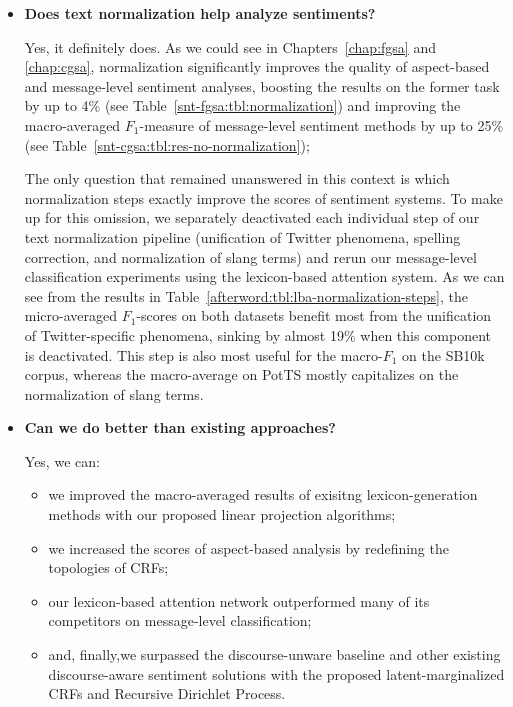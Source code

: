 \documentclass[11pt]{article}
\newcommand{\F}[0]{$F_1$}
\begin{document}
\begin{itemize}
  \item\textbf{Does text normalization help analyze sentiments?}

    Yes, it definitely does.  As we could see in
    Chapters~\ref{chap:fgsa} and \ref{chap:cgsa}, normalization
    significantly improves the quality of aspect-based and
    message-level sentiment analyses, boosting the results on the
    former task by up to 4\% (see
    Table~\ref{snt-fgsa:tbl:normalization}) and improving the
    macro-averaged \F{}-measure of message-level sentiment methods by
    up to 25\% (see Table~\ref{snt-cgsa:tbl:res-no-normalization});

    The only question that remained unanswered in this context is
    which normalization steps exactly improve the scores of sentiment
    systems.  To make up for this omission, we separately deactivated
    each individual step of our text normalization pipeline
    (unification of Twitter phenomena, spelling correction, and
    normalization of slang terms) and rerun our message-level
    classification experiments using the lexicon-based attention
    system.  As we can see from the results in
    Table~\ref{afterword:tbl:lba-normalization-steps}, the
    micro-averaged \F{}-scores on both datasets benefit most from the
    unification of Twitter-specific phenomena, sinking by almost 19\%
    when this component is deactivated.  This step is also most useful
    for the macro-\F{} on the SB10k corpus, whereas the macro-average
    on PotTS mostly capitalizes on the normalization of slang terms.

  \item\textbf{Can we do better than existing approaches?}

    Yes, we can:
    \begin{itemize}
    \item we improved the macro-averaged results of exisitng
      lexicon-generation methods with our proposed linear projection
      algorithms;
    \item we increased the scores of aspect-based analysis by
      redefining the topologies of CRFs;
    \item our lexicon-based attention network outperformed many of
      its competitors on message-level classification;
    \item and, finally,we surpassed the discourse-unware baseline and
      other existing discourse-aware sentiment solutions with the
      proposed latent-marginalized CRFs and Recursive Dirichlet
      Process.
    \end{itemize}
\end{itemize}



\end{document}
